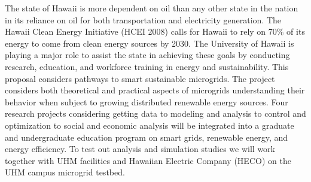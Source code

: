 \documentclass{proposalnsf}
\begin{document}




\noindent The state of Hawaii is more dependent on oil than any other state in
the nation in its reliance on oil for both transportation and electricity generation.
The Hawaii Clean Energy Initiative (HCEI 2008) calls for Hawaii to
rely on 70\% of its energy to come from clean energy sources by 2030.   The University of
Hawaii is playing a major role to assist the state in achieving these goals by
conducting research, education, and workforce training in energy and sustainability.
This proposal considers  pathways to smart sustainable microgrids.   The project
considers both theoretical and practical aspects of microgrids understanding their
behavior when subject to growing distributed renewable energy sources.   Four research
projects considering getting data to modeling and analysis to control and optimization to
social and economic analysis will be integrated into a graduate and undergraduate
education program on smart grids, renewable energy, and energy efficiency.  To
test out analysis and simulation studies we will work together with UHM
facilities and Hawaiian Electric Company (HECO) on  the UHM campus microgrid testbed.
\end{document}
